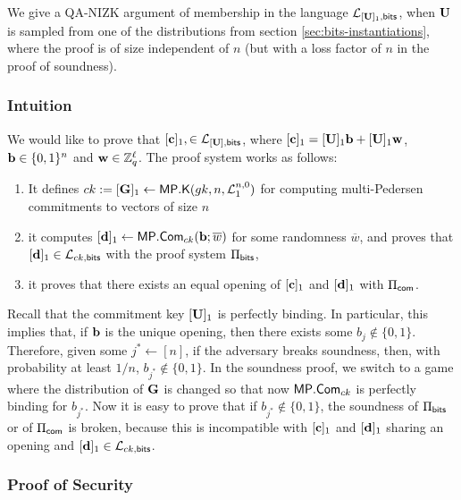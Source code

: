 We give a QA-NIZK argument of membership in the language $\mathcal{L}_{[\mathbf{{U}}]_1,\mathsf{bits}}$, when $\mathbf{{U}}$ is sampled from one of the distributions from section \ref{sec:bits-instantiations}, where the proof is of size independent of $n$ (but with a loss factor of $n$ in the proof of soundness). 


\subsubsection{Intuition}
We would like to prove that
$[\mathbf{c}]_1, \in \mathcal{L}_{[\mathbf{{U}}],\mathsf{bits}}$, where $[\mathbf{c}]_1=[\mathbf{{U}}]_1\mathbf{b}+[\mathbf{{U}}]_1\mathbf{w}$, $\mathbf{b} \in \{0,1\}^n$ and $\mathbf{w}\in\mathbb{Z}_q^\ell$. The proof system works as follows:
\begin{enumerate}
\item It defines  
${ck}:=[\mathbf{{G}}]_1\gets\mathsf{MP}.\mathsf{K}(gk,n,\mathcal{L}_{1}^{n,0})$ for computing multi-Pedersen commitments to vectors of size $n$

\item it computes $[\mathbf{d}]_1\gets\mathsf{MP}.\mathsf{Com}_{{ck}}(\mathbf{b};\overline{w})$ for some 
randomness $\overline{w}$, and proves that $[\mathbf{d}]_1\in\mathcal{L}_{{ck},\mathsf{bits}}$ with the proof system $\Pi_{\mathsf{bits}}$,
\item it  proves that there exists an equal opening of $[\mathbf{c}]_1$ and $[\mathbf{d}]_1$ with  $\Pi_{\mathsf{com}}$.
\end{enumerate}

Recall that the commitment key $[\mathbf{{U}}]_1$ is 
perfectly binding. In particular, this implies that, if $\mathbf{b}$ is the unique opening, then there exists some $b_{j} \notin \{0,1\}$. Therefore, given some $j^* \gets [n]$, if the adversary breaks soundness, then, with probability at least $1/n$, $b_{j^*} \notin \{0,1\}$. In the soundness proof, we switch to a game where the distribution of ${\mathbf{{G}}}$ is changed so that now 
$\mathsf{MP}.\mathsf{Com}_{{ck}}$ is perfectly binding for $b_{j^*}$. Now it is easy to prove that if $b_{j^*} \notin \{0,1\}$, the soundness of $\Pi_{\mathsf{bits}}$ or of $\Pi_{\mathsf{com}}$ is broken, because this is incompatible with $[\mathbf{c}]_1$ and $[\mathbf{d}]_1$ sharing an opening and $[\mathbf{d}]_1 \in\mathcal{L}_{{ck},\mathsf{bits}}$.


\subsubsection{Proof of Security}

